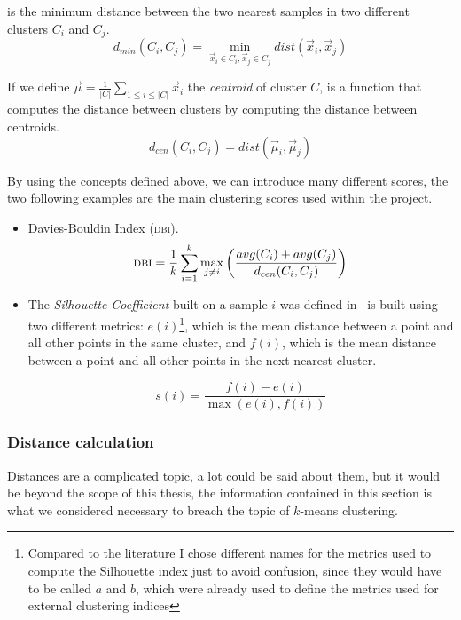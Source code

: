  is the minimum distance between the two nearest samples in two
different clusters $C_i$ and $C_j$.
\begin{equation}
	\label{eq:inter-cluster-distance}
	d_{min}(C_i, C_j) = \min_{\vec{x}_i \in C_i, \vec{x}_j \in C_j} dist(\vec{x}_i, \vec{x}_j)
\end{equation}

If we define $\vec{\mu} = \frac{1}{|C|} \sum_{1 \leq i \leq |C|} \vec{x}_i$ the \emph{centroid} of
cluster $C$,  is a function that computes the distance between
clusters by computing the distance between centroids.
\begin{equation}
	\label{eq:cluster-centroid-distance}
	d_{cen}(C_i, C_j) = dist(\vec{\mu}_i, \vec{\mu}_j)
\end{equation}

By using the concepts defined above, we can introduce many different scores, the two following
examples are the main clustering scores used within the project.

\begin{itemize}
	\item Davies-Bouldin Index (\textsc{dbi})\cite{bouldin1979}.
		\begin{equation*}
			\textsc{dbi} = \frac{1}{k}\sum_{i = 1}^k\max_{j \neq i}\left(\frac{avg(C_i) + avg(C_j)}{d_{cen}(C_i, C_j)}\right)
		\end{equation*}
	\item The \emph{Silhouette Coefficient} built on a sample $i$ was defined in~\cite{rousseuw1987}
		is built using two different metrics: $e(i)$\footnote{Compared to the literature I
		chose different names for the metrics used to compute the Silhouette index just to
		avoid confusion, since they would have to be called $a$ and $b$, which were already
		used to define the metrics used for external clustering indices}, which is the mean
		distance between a point and all other points in the same cluster, and $f(i)$, which is
		the mean distance between a point and all other points in the next nearest cluster.

		\begin{equation*}
			s(i) = \frac{f(i) - e(i)}{\max(e(i), f(i))}
		\end{equation*}
\end{itemize}

\subsubsection{Distance calculation}
\label{ssec:distance-calculation}
Distances are a complicated topic, a lot could be said about them, but it would be beyond the scope
of this thesis, the information contained in this section is what we considered necessary to breach
the topic of $k$-means clustering.

